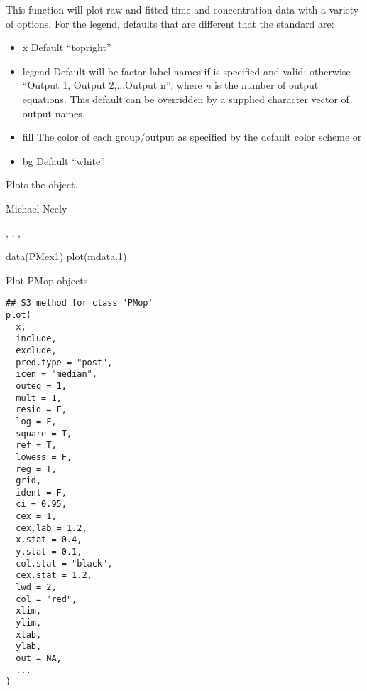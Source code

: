 \documentclass[a4paper]{book}
\begin{document}
%
\begin{Details}\relax
This function will plot raw and fitted time and concentration data with a variety of options.
For the legend, defaults that are different that the standard are:
\begin{itemize}

\item{} x Default ``topright''
\item{} legend Default will be factor label names if  is specified and valid; otherwise
``Output 1, Output 2,...Output n'', where \emph{n} is the number of output equations.  This default
can be overridden by a supplied character vector of output names.
\item{} fill The color of each group/output as specified by the default color scheme or 
\item{} bg Default ``white''

\end{itemize}

\end{Details}
%
\begin{Value}
Plots the object.
\end{Value}
%
\begin{Author}\relax
Michael Neely
\end{Author}
%
\begin{SeeAlso}\relax
{}, , , 
\end{SeeAlso}
%
\begin{Examples}
\begin{ExampleCode}
data(PMex1)
plot(mdata.1)
\end{ExampleCode}
\end{Examples}
%
\begin{Description}\relax
Plot PMop objects
\end{Description}
%
\begin{Usage}
\begin{verbatim}
## S3 method for class 'PMop'
plot(
  x,
  include,
  exclude,
  pred.type = "post",
  icen = "median",
  outeq = 1,
  mult = 1,
  resid = F,
  log = F,
  square = T,
  ref = T,
  lowess = F,
  reg = T,
  grid,
  ident = F,
  ci = 0.95,
  cex = 1,
  cex.lab = 1.2,
  x.stat = 0.4,
  y.stat = 0.1,
  col.stat = "black",
  cex.stat = 1.2,
  lwd = 2,
  col = "red",
  xlim,
  ylim,
  xlab,
  ylab,
  out = NA,
  ...
)
\end{verbatim}
\end{Usage}
\end{document}

